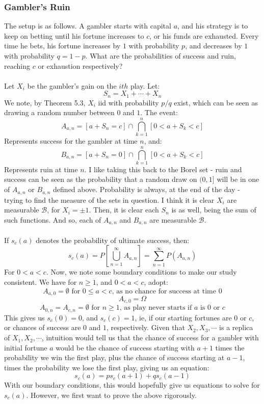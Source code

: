\documentclass[12pt,a4paper]{article}
\newcommand{\1}[1]{\mathbbm{1}\left\{ #1 \right\}}
\newcommand{\bcal}{\mathcal{B}}
\begin{document}
\subsubsection{Gambler's Ruin}
The setup is as follows. A gambler starts with capital $a$, and his strategy is to keep on betting until his fortune increases to $c$, or his funds are exhausted. Every time he bets, his fortune increases by $1$ with probability $p$, and decreases by $1$ with probability $q = 1 - p$. What are the probabilities of success and ruin, reaching $c$ or exhaustion respectively?
\\\\
Let $X_i$ be the gambler's gain on the $ith$ play. Let:
$$
	S_n = X_1 + \cdots + X_n
$$
We note, by Theorem 5.3, $X_i$ iid with probability $p/q$ exist, which can be seen as drawing a random number between $0$ and $1$. The event:
$$
	A_{a,n} = [a + S_n = c] \cap \bigcap_{k=1}^n [0 < a + S_k < c]
$$
Represents success for the gambler at time $n$, and:
$$
	B_{a,n} = [a + S_n = 0] \cap \bigcap_{k=1}^n [0 < a + S_k < c]
$$
Represents ruin at time $n$. I like taking this back to the Borel set - ruin and success can be seen as the probability that a random draw on $(0,1]$ will be in one of $A_{a,n}$ or $B_{a,n}$ defined above. Probability is always, at the end of the day - trying to find the measure of the sets in question. I think it is clear $X_i$ are measurable $\bcal$, for $X_i = \pm 1$. Then, it is clear each $S_n$ is as well, being the sum of such functions. And so, each of $A_{a,n}$ and $B_{a,n}$ are measurable $\bcal$.
\\\\
If $s_c(a)$ denotes the probability of ultimate success, then:
$$
	s_c(a) = P\left[\bigcup_{n = 1}^\infty A_{a,n}\right] = \sum_{n=1}^\infty P(A_{a,n})
$$
For $0 < a < c$. Now, we note some boundary conditions to make our study consistent. We have for $n \geq 1$, and $0 < a < c$, adopt:
$$
	A_{a,0} = \emptyset \text{ for $0 \leq a < c$, as no chance for success at time $0$}
$$
$$
	A_{c,0} = \Omega
$$
$$
	A_{0,n} = A_{c,n} = \emptyset \text{ for $n \geq 1$, as play never starts if $a$ is $0$ or $c$}
$$
This gives us $s_c(0) = 0$, and $s_c(c) = 1$, ie, if our starting fortunes are $0$ or $c$, or chances of success are $0$ and $1$, respectively. Given that $X_2, X_3, \cdots$ is a replica of $X_1, X_2, \cdots$, intuition would tell us that the chance of success for a gambler with initial fortune $a$ would be the chance of success starting with $a + 1$ times the probability we win the first play, plus the chance of success starting at $a - 1$, times the probability we lose the first play, giving us an equation:
$$
	s_c(a) = ps_c(a + 1) + qs_c(a - 1)
$$
With our boundary conditions, this would hopefully give us equations to solve for $s_c(a)$. However, we first want to prove the above rigorously. 
\end{document}
